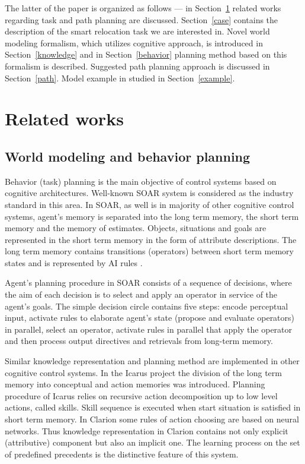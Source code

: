 \documentclass[runningheads,a4paper]{llncs}
\begin{document}
The latter of the paper is organized as follows --- in Section~\ref{works} related works regarding task and path planning are discussed. Section~\ref{case} contains the description of the smart relocation task we are interested in. Novel world modeling formalism, which utilizes cognitive approach, is introduced in Section~\ref{knowledge} and in Section~\ref{behavior} planning method based on this formalism is described. Suggested path planning approach is discussed in Section~\ref{path}. Model example in studied in Section~\ref{example}.

\section{Related works}\label{works}
\subsection{World modeling and behavior planning}

Behavior (task) planning is the main objective of control systems based on cognitive architectures. Well-known SOAR \cite{Laird2008,Laird2012} system is considered as the industry standard in this area. In SOAR, as well is in majority of other cognitive control systems, agent's memory is separated into the long term memory, the short term memory and the memory of estimates. Objects, situations and goals are represented in the short term memory in the form of attribute descriptions. The long term memory contains transitions (operators) between short term memory states and is represented by AI rules \cite{Nilsson1998}.
 
Agent's planning procedure in SOAR consists of a sequence of decisions, where the aim of each decision is to select and apply an operator in service of the agent's goals. The simple decision circle contains five steps: encode perceptual input, activate rules to elaborate agent's state (propose and evaluate operators) in parallel, select an operator, activate rules in parallel that apply the operator and then process output directives and retrievals from long-term memory.

Similar knowledge representation and planning method are implemented in other cognitive control systems. In the Icarus project \cite{Langley1997,Langley2006} the division of the long term memory into conceptual and action memories was introduced. Planning procedure of Icarus relies on recursive action decomposition up to low level actions, called skills. Skill sequence is executed when start situation is satisfied in short term memory. In Clarion \cite{Sun1994,Sun2006} some rules of action choosing are based on neural networks. Thus knowledge representation in Clarion contains not only explicit (attributive) component but also an implicit one. The learning process on the set of predefined precedents is the distinctive feature of this system.
\end{document}
